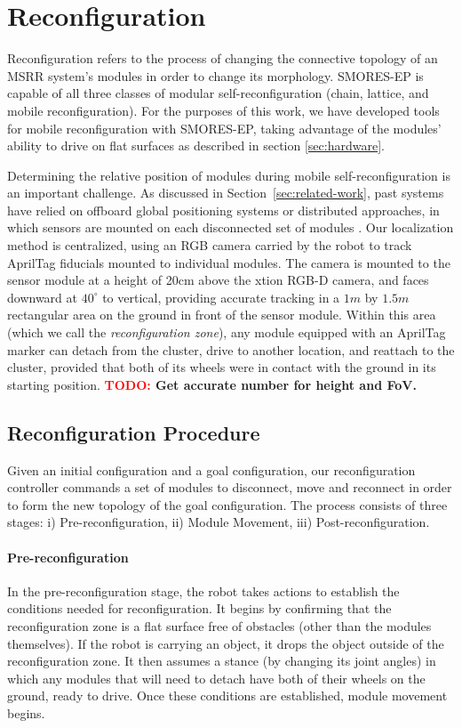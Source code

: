 \documentclass[conference]{IEEEtran}
\newcommand{\TODO}[1]{ {\bf \textcolor{red}{TODO:} #1 }}
\begin{document}
\section{Reconfiguration}
\label{sec:reconfiguration}
%
Reconfiguration refers to the process of changing the connective topology of an MSRR system's modules in order to change its morphology.  SMORES-EP is capable of all three classes of modular self-reconfiguration (chain, lattice, and mobile reconfiguration).  For the purposes of this work, we have developed tools for mobile reconfiguration with SMORES-EP, taking advantage of the modules' ability to drive on flat surfaces as described in section \ref{sec:hardware}.

Determining the relative position of modules during mobile self-reconfiguration is an important challenge. As discussed in Section~\ref{sec:related-work}, past systems have relied on offboard global positioning systems \cite{Paulos2015} or distributed approaches, in which sensors are mounted on each disconnected set of modules \cite{Yim2007}.  Our localization method is centralized, using an RGB camera carried by the robot to track AprilTag fiducials mounted to individual modules.  The camera is mounted to the sensor module at a height of 20cm above the xtion RGB-D camera, and faces downward at \(40^\circ\) to vertical, providing accurate tracking in a \(1m\) by \(1.5m\) rectangular area on the ground in front of the sensor module.  Within this area (which we call the \emph{reconfiguration zone}), any module equipped with an AprilTag marker can detach from the cluster, drive to another location, and reattach to the cluster, provided that both of its wheels were in contact with the ground in its starting position. \TODO{Get accurate number for height and FoV.}

\subsection{Reconfiguration Procedure}
Given an initial configuration and a goal configuration, our reconfiguration controller commands a set of modules to disconnect, move and reconnect in order to form the new topology of the goal configuration. The process consists of three stages: i) Pre-reconfiguration, ii) Module Movement, iii) Post-reconfiguration.

\paragraph{Pre-reconfiguration} In the pre-reconfiguration stage, the robot takes actions to establish the conditions needed for reconfiguration.  It begins by confirming that the reconfiguration zone is a flat surface free of obstacles (other than the modules themselves).  If the robot is carrying an object, it drops the object outside of the reconfiguration zone. It then assumes a stance (by changing its joint angles) in which any modules that will need to detach have both of their wheels on the ground, ready to drive. Once these conditions are established, module movement begins.
\end{document}
